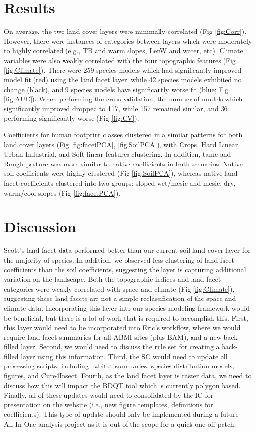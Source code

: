 \documentclass[12pt]{article}
\begin{document}
\section{Results}

On average, the two land cover layers were minimally correlated (Fig \ref{fig:Corr}). However, there were instances of categories between layers which were moderately to highly correlated (e.g., TB and warm slopes, LenW and water, etc). Climate variables were also weakly correlated with the four topographic features (Fig \ref{fig:Climate}). There were 259 species models which had significantly improved model fit (red) using the land facet layer, while 42 species models exhibited no change (black), and 9 species models have significantly worse fit (blue; Fig \ref{fig:AUC}). When performing the cross-validation, the number of models which significantly improved dropped to 117, while 157 remained similar, and 36 performing significantly worse (Fig \ref{fig:CV}).

Coefficients for human footprint classes clustered in a similar patterns for both land cover layers (Fig \ref{fig:facetPCA}, \ref{fig:SoilPCA}), with Crops, Hard Linear, Urban Industrial, and Soft linear features clustering. In addition, tame and Rough pasture was more similar to native coefficients in both scenarios. Native soil coefficients were highly clustered (Fig \ref{fig:SoilPCA}), whereas native land facet coefficients clustered into two groups: sloped wet/mesic and mesic, dry, warm/cool slopes (Fig \ref{fig:facetPCA}).

\section{Discussion}

Scott's land facet data performed better than our current soil land cover layer for the majority of species. In addition, we observed less clustering of land facet coefficients than the soil coefficients, suggesting the layer is capturing additional variation on the landscape. Both the topographic indices and land facet categories were weakly correlated with space and climate (Fig \ref{fig:Climate}), suggesting these land facets are not a simple reclassification of the space and climate data. Incorporating this layer into our species modeling framework would be beneficial, but there is a lot of work that is required to accomplish this. First, this layer would need to be incorporated into Eric's workflow, where we would require land facet summaries for all ABMI sites (plus BAM), and a new back-filled layer. Second, we would need to discuss the rule set for creating a back-filled layer using this information. Third, the SC would need to update all processing scripts, including habitat summaries, species distribution models, figures, and Cure4Insect. Fourth, as the land facet layer is raster data, we need to discuss how this will impact the BDQT tool which is currently polygon based. Finally, all of these updates would need to consolidated by the IC for presentation on the website (i.e., new figure templates, definitions for coefficients). This type of update should only be implemented during a future All-In-One analysis project as it is out of the scope for a quick one off patch.
\end{document}
